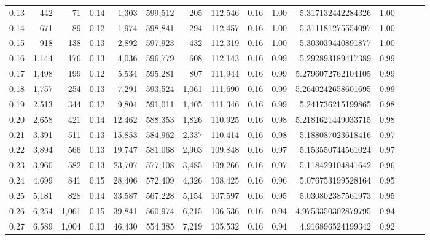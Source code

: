 \begin{tabular}{rrrrrrrrrrrrrrr}
0.13 &      442 &      71 &  0.14 &    1,303 &  599,512 &      205 &  112,546 &  0.16 &  1.00 &       5.317132442284326 &      1.00 \\
0.14 &      671 &      89 &  0.12 &    1,974 &  598,841 &      294 &  112,457 &  0.16 &  1.00 &       5.311181275554097 &      1.00 \\
0.15 &      918 &     138 &  0.13 &    2,892 &  597,923 &      432 &  112,319 &  0.16 &  1.00 &       5.303039440891877 &      1.00 \\
0.16 &    1,144 &     176 &  0.13 &    4,036 &  596,779 &      608 &  112,143 &  0.16 &  0.99 &       5.292893189417389 &      0.99 \\
0.17 &    1,498 &     199 &  0.12 &    5,534 &  595,281 &      807 &  111,944 &  0.16 &  0.99 &      5.2796072762104105 &      0.99 \\
0.18 &    1,757 &     254 &  0.13 &    7,291 &  593,524 &    1,061 &  111,690 &  0.16 &  0.99 &      5.2640242658601695 &      0.99 \\
0.19 &    2,513 &     344 &  0.12 &    9,804 &  591,011 &    1,405 &  111,346 &  0.16 &  0.99 &       5.241736215199865 &      0.98 \\
0.20 &    2,658 &     421 &  0.14 &   12,462 &  588,353 &    1,826 &  110,925 &  0.16 &  0.98 &      5.2181621449033715 &      0.98 \\
0.21 &    3,391 &     511 &  0.13 &   15,853 &  584,962 &    2,337 &  110,414 &  0.16 &  0.98 &       5.188087023618416 &      0.97 \\
0.22 &    3,894 &     566 &  0.13 &   19,747 &  581,068 &    2,903 &  109,848 &  0.16 &  0.97 &       5.153550744561024 &      0.97 \\
0.23 &    3,960 &     582 &  0.13 &   23,707 &  577,108 &    3,485 &  109,266 &  0.16 &  0.97 &       5.118429104841642 &      0.96 \\
0.24 &    4,699 &     841 &  0.15 &   28,406 &  572,409 &    4,326 &  108,425 &  0.16 &  0.96 &       5.076753199528164 &      0.95 \\
0.25 &    5,181 &     828 &  0.14 &   33,587 &  567,228 &    5,154 &  107,597 &  0.16 &  0.95 &       5.030802387561973 &      0.95 \\
0.26 &    6,254 &   1,061 &  0.15 &   39,841 &  560,974 &    6,215 &  106,536 &  0.16 &  0.94 &      4.9753350302879795 &      0.94 \\
0.27 &    6,589 &   1,004 &  0.13 &   46,430 &  554,385 &    7,219 &  105,532 &  0.16 &  0.94 &       4.916896524199342 &      0.92 \\

\end{tabular}
